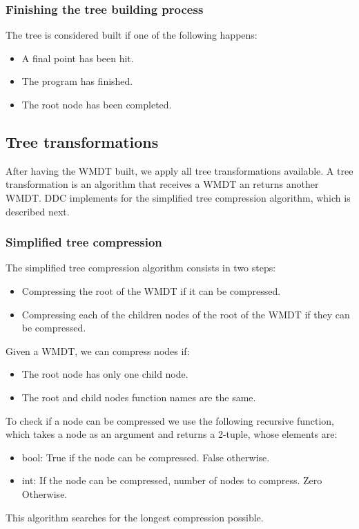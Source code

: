 \subsubsection{Finishing the tree building process}
The tree is considered built if one of the following happens:
\begin{itemize}
    \item A final point has been hit.
    \item The program has finished.
    \item The root node has been completed.
\end{itemize}
\subsection{Tree transformations}
After having the WMDT built, we apply all tree transformations available.
A tree transformation is an algorithm that receives a WMDT an returns another WMDT.
DDC implements for the simplified tree compression algorithm, which is described next.
\subsubsection{Simplified tree compression}
The simplified tree compression algorithm consists in two steps:
\begin{itemize}
    \item Compressing the root of the WMDT if it can be compressed.
    \item Compressing each of the children nodes of the root of the WMDT if they can be compressed.
\end{itemize}
Given a WMDT, we can compress nodes if:
\begin{itemize}
    \item The root node has only one child node.
    \item The root and child nodes function names are the same.
\end{itemize}
To check if a node can be compressed we use the following recursive function, which takes a node as an argument and returns a 2-tuple, whose elements are:
\begin{itemize}
    \item bool: True if the node can be compressed. False otherwise.
    \item int: If the node can be compressed, number of nodes to compress. Zero Otherwise.
\end{itemize}
This algorithm searches for the longest compression possible.


